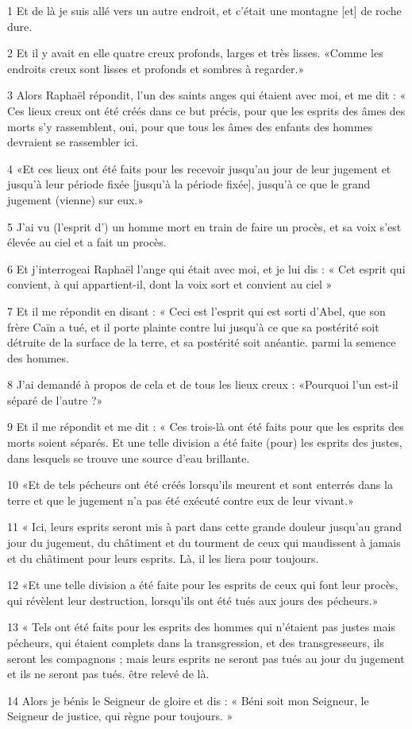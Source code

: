 \par 1 Et de là je suis allé vers un autre endroit, et c'était une montagne [et] de roche dure.
\par 2 Et il y avait en elle quatre creux profonds, larges et très lisses. «Comme les endroits creux sont lisses et profonds et sombres à regarder.»
\par 3 Alors Raphaël répondit, l'un des saints anges qui étaient avec moi, et me dit : « Ces lieux creux ont été créés dans ce but précis, pour que les esprits des âmes des morts s'y rassemblent, oui, pour que tous les âmes des enfants des hommes devraient se rassembler ici.
\par 4 «Et ces lieux ont été faits pour les recevoir jusqu'au jour de leur jugement et jusqu'à leur période fixée [jusqu'à la période fixée], jusqu'à ce que le grand jugement (vienne) sur eux.»
\par 5 J'ai vu (l'esprit d') un homme mort en train de faire un procès, et sa voix s'est élevée au ciel et a fait un procès.
\par 6 Et j'interrogeai Raphaël l'ange qui était avec moi, et je lui dis : « Cet esprit qui convient, à qui appartient-il, dont la voix sort et convient au ciel »
\par 7 Et il me répondit en disant : « Ceci est l'esprit qui est sorti d'Abel, que son frère Caïn a tué, et il porte plainte contre lui jusqu'à ce que sa postérité soit détruite de la surface de la terre, et sa postérité soit anéantie. parmi la semence des hommes.
\par 8 J'ai demandé à propos de cela et de tous les lieux creux : «Pourquoi l'un est-il séparé de l'autre ?»
\par 9 Et il me répondit et me dit : « Ces trois-là ont été faits pour que les esprits des morts soient séparés. Et une telle division a été faite (pour) les esprits des justes, dans lesquels se trouve une source d'eau brillante.
\par 10 «Et de tels pécheurs ont été créés lorsqu'ils meurent et sont enterrés dans la terre et que le jugement n'a pas été exécuté contre eux de leur vivant.»
\par 11 « Ici, leurs esprits seront mis à part dans cette grande douleur jusqu'au grand jour du jugement, du châtiment et du tourment de ceux qui maudissent à jamais et du châtiment pour leurs esprits. Là, il les liera pour toujours.
\par 12 «Et une telle division a été faite pour les esprits de ceux qui font leur procès, qui révèlent leur destruction, lorsqu'ils ont été tués aux jours des pécheurs.»
\par 13 « Tels ont été faits pour les esprits des hommes qui n'étaient pas justes mais pécheurs, qui étaient complets dans la transgression, et des transgresseurs, ils seront les compagnons ; mais leurs esprits ne seront pas tués au jour du jugement et ils ne seront pas tués. être relevé de là.
\par 14 Alors je bénis le Seigneur de gloire et dis : « Béni soit mon Seigneur, le Seigneur de justice, qui règne pour toujours. »

